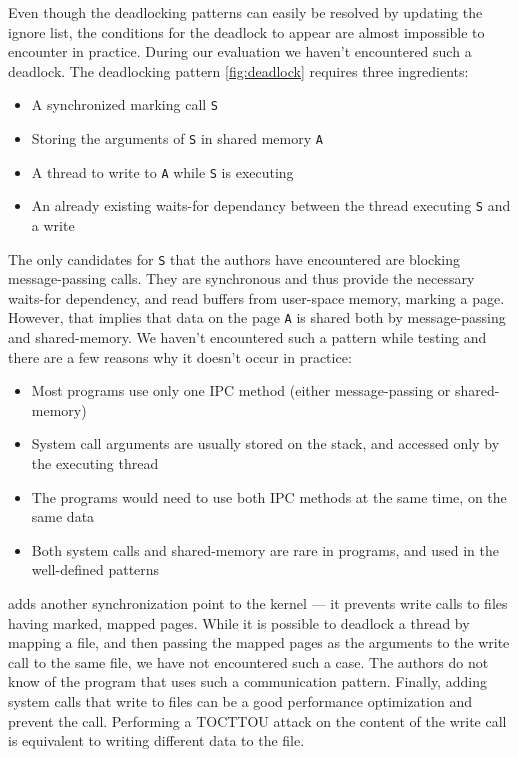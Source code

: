 Even though the deadlocking patterns can easily be resolved by updating the
ignore list, the conditions for the deadlock to appear are almost impossible to
encounter in practice. During our evaluation we haven't encountered such a
deadlock. The deadlocking pattern \autoref{fig:deadlock} requires three
ingredients:

\begin{itemize}
  \item A synchronized marking call \texttt{S}
  \item Storing the arguments of \texttt{S} in shared memory \texttt{A}
  \item A thread to write to \texttt{A} while \texttt{S} is executing
  \item An already existing waits-for dependancy between the thread executing \texttt{S} and a write
\end{itemize}

The only candidates for \texttt{S} that the authors have encountered are
blocking message-passing calls. They are synchronous and thus provide the
necessary waits-for dependency, and read buffers from user-space memory, marking
a page. However, that implies that data on the page \texttt{A} is shared both by
message-passing and shared-memory. We haven't encountered such a pattern while
testing \sysname and there are a few reasons why it doesn't occur in practice:

\begin{itemize}
  \item Most programs use only one IPC method (either message-passing or shared-memory)
  \item System call arguments are usually stored on the stack, and accessed only by the executing thread
  \item The programs would need to use both IPC methods at the same time, on the same data
  \item Both system calls and shared-memory are rare in programs, and used in the well-defined patterns
\end{itemize}

\sysname adds another synchronization point to the kernel --- it prevents write
calls to files having marked, mapped pages. While it is possible to deadlock
a thread by mapping a file, and then passing the mapped pages as the arguments to
the write call to the same file, we have not encountered such a case. The authors
do not know of the program that uses such a communication pattern. Finally, adding
system calls that write to files can be a good performance optimization and prevent
the call. Performing a TOCTTOU attack on the content of the write call is equivalent
to writing different data to the file.

